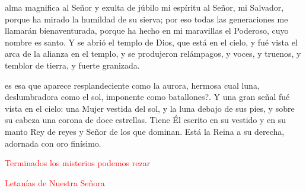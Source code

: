\documentclass[10pt,twoside]{book}
\begin{document}
\vspace{2mm}
alma magnifica al Señor y exulta de júbilo mi espíritu al Señor, mi Salvador, porque ha mirado la humildad de su sierva;
por eso todas las generaciones me llamarán bienaventurada, porque ha hecho en mi maravillas el Poderoso, cuyo nombre es santo. Y se abrió el templo de Dios, que está en el cielo,
y fué vista el arca de la alianza en el templo, y se produjeron relámpagos, y voces, y truenos, y temblor de tierra, y fuerte granizada.\\[2mm]

\vspace{5mm}

\vspace{2mm}
es esa que aparece resplandeciente como la aurora, hermosa cual luna, deslumbradora como el sol, imponente como batallones?.
Y una gran señal fué vista en el cielo: una Mujer vestida del sol, y la luna debajo de sus  pies, y sobre su cabeza una corona de doce estrellas.
Tiene Él escrito en su vestido y en su manto Rey de reyes y Señor de los que dominan. Está la Reina a su derecha, adornada con oro finísimo.\\[2mm]

\vspace{5mm}

\label{final-prayer}
\begin{center}
      \textcolor{red}{Terminados los misterios podemos rezar}
\end{center}

\begin{paracol}{2}
      \vspace{6mm}
      \vspace{6mm}
      \vspace{6mm}
\end{paracol}
\vspace{3mm}
\begin{center}
      \textcolor{red}{Letanías de Nuestra Señora}
\end{center}
\end{document}

